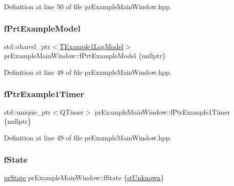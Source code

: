 Definition at line 50 of file pr\+Example\+Main\+Window.\+hpp.

\mbox{\label{classpr_example_main_window_a84daab325be29ff2752e7237495b6ea6}} 
\subsubsection{\texorpdfstring{f\+Prt\+Example\+Model}{fPrtExampleModel}}
{\footnotesize\ttfamily std\+::shared\+\_\+ptr$<$\hyperlink{class_t_example1_log_model}{T\+Example1\+Log\+Model}$>$ pr\+Example\+Main\+Window\+::f\+Prt\+Example\+Model \{nullptr\}\hspace{0.3cm}{\ttfamily [private]}}



Definition at line 48 of file pr\+Example\+Main\+Window.\+hpp.

\mbox{\label{classpr_example_main_window_ac1eb03a4265e3a97107cb98958915026}} 
\subsubsection{\texorpdfstring{f\+Ptr\+Example1\+Timer}{fPtrExample1Timer}}
{\footnotesize\ttfamily std\+::unique\+\_\+ptr$<$Q\+Timer$>$ pr\+Example\+Main\+Window\+::f\+Ptr\+Example1\+Timer \{nullptr\}\hspace{0.3cm}{\ttfamily [private]}}



Definition at line 49 of file pr\+Example\+Main\+Window.\+hpp.

\mbox{\label{classpr_example_main_window_af1e816ef2265cf59efcb65f59a16cc7d}} 
\subsubsection{\texorpdfstring{f\+State}{fState}}
{\footnotesize\ttfamily \hyperlink{classpr_example_main_window_ac6ea07691b05604b1dda8ec6263c028c}{pr\+State} pr\+Example\+Main\+Window\+::f\+State \{\hyperlink{classpr_example_main_window_ac6ea07691b05604b1dda8ec6263c028ca2d9733465da996ba5c35c393c9d2880e}{st\+Unknown}\}\hspace{0.3cm}{\ttfamily [private]}}




